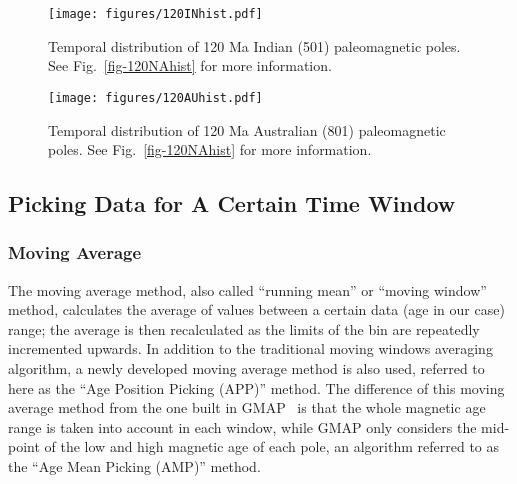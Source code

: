 \begin{figure*}
\centering
\texttt{[image: figures/120INhist.pdf]}
\caption[Distribution of 120 Ma Indian poles]{Temporal distribution
of 120 Ma Indian (501) paleomagnetic poles. See
Fig.~\ref{fig-120NAhist} for more information.}\label{fig-120INhist}
\end{figure*}

\begin{figure*}
\centering
\texttt{[image: figures/120AUhist.pdf]}
\caption[Distribution of 120 Ma Australian poles]{Temporal
distribution of 120 Ma Australian (801) paleomagnetic poles. See
Fig.~\ref{fig-120NAhist} for more information.}\label{fig-120AUhist}
\end{figure*}

\subsection{Picking Data for A Certain Time Window}

\subsubsection{Moving Average}

The moving average method, also called ``running mean'' or ``moving
window''~\cite{T08} method, calculates the average of values between a certain
data (age in our case) range; the average is then recalculated as the limits of
the bin are repeatedly incremented upwards. In addition to the traditional
moving windows averaging algorithm, a newly developed moving average method is
also used, referred to here as the ``Age Position Picking (APP)'' method. The
difference of this moving average method from the one built in
GMAP~\cite{T99,T08} is that the whole magnetic age range is taken into account
in each window, while GMAP only considers the mid-point of the low and high
magnetic age of each pole, an algorithm referred to as the ``Age Mean Picking
(AMP)'' method.

